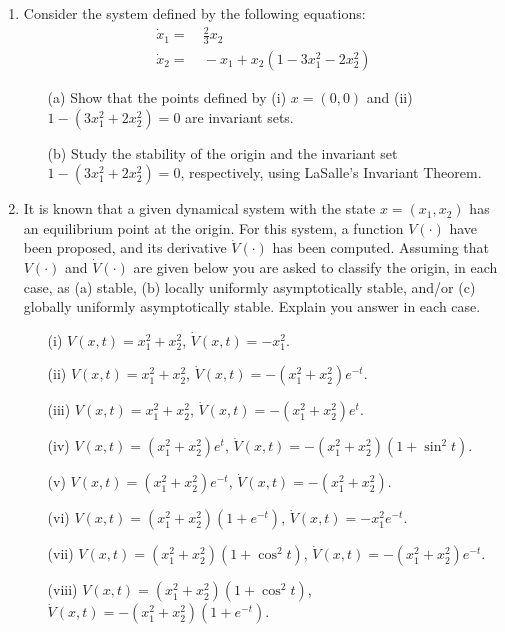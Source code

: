 \documentclass[a4paper,11pt]{article}
\begin{document}
\begin{enumerate}


   \item Consider the system defined by the following equations:
 \begin{align*}
 \dot x_1=&~\frac{2}{3}x_2\\
 \dot x_2=&~-x_1+x_2(1-3x_1^2-2x_2^2)
 \end{align*}
\begin{itemize}
  \item[(a)] Show that the points defined by (i) $x=(0,0)$ and (ii) $1-(3x_1^2+2x_2^2)=0$ are invariant sets.
  \item[(b)] Study the stability of the origin and the invariant set $1-(3x_1^2+2x_2^2)=0$, respectively, using LaSalle's Invariant Theorem.
\end{itemize}

 \item It is known that a given dynamical system with the state $x=(x_1,x_2)$ has an equilibrium point at the origin. For this system, a function $V(\cdot)$ have been proposed, and its derivative $\dot V(\cdot)$
 has been computed. Assuming that $V(\cdot)$ and $\dot V(\cdot)$ are given below you are asked to classify the origin, in each case, as (a) stable, (b) locally uniformly asymptotically stable, and/or (c) globally uniformly asymptotically stable. Explain you answer in each case.

 \begin{itemize}
 \item[(i)] $V(x,t)=x_1^2+x_2^2$, $\dot V(x,t)=-x_1^2$.
\item[(ii)] $V(x,t)=x_1^2+x_2^2$, $\dot V(x,t)=-(x_1^2+x_2^2)e^{-t}$.
\item[(iii)] $V(x,t)=x_1^2+x_2^2$, $\dot V(x,t)=-(x_1^2+x_2^2)e^{t}$.
\item[(iv)] $V(x,t)=(x_1^2+x_2^2)e^t$, $\dot V(x,t)=-(x_1^2+x_2^2)(1+\sin^2t)$.
\item[(v)] $V(x,t)=(x_1^2+x_2^2)e^{-t}$, $\dot V(x,t)=-(x_1^2+x_2^2)$.
\item[(vi)] $V(x,t)=(x_1^2+x_2^2)(1+e^{-t})$, $\dot V(x,t)=-x_1^2e^{-t}$.
\item[(vii)] $V(x,t)=(x_1^2+x_2^2)(1+\cos^2t)$, $\dot V(x,t)=-(x_1^2+x_2^2)e^{-t}$.
\item[(viii)] $V(x,t)=(x_1^2+x_2^2)(1+\cos^2t)$, $\dot V(x,t)=-(x_1^2+x_2^2)(1+e^{-t})$.
 \end{itemize}



\end{enumerate}
\end{document}

